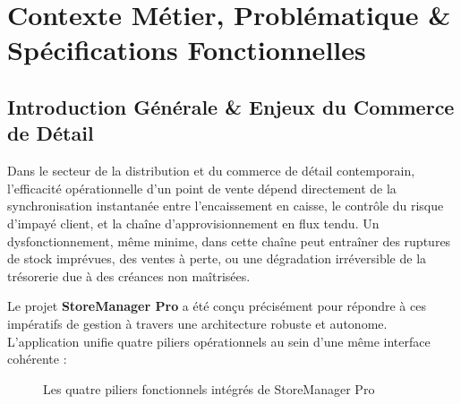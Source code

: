 \documentclass[11pt,a4paper,titlepage,twoside,openright]{report}
\begin{document}
\lstlistoflistings
{}
\clearpage


\chapter{Contexte Métier, Problématique \& Spécifications Fonctionnelles}

\section{Introduction Générale \& Enjeux du Commerce de Détail}

Dans le secteur de la distribution et du commerce de détail contemporain, l'efficacité opérationnelle d'un point de vente dépend directement de la synchronisation instantanée entre l'encaissement en caisse, le contrôle du risque d'impayé client, et la chaîne d'approvisionnement en flux tendu. Un dysfonctionnement, même minime, dans cette chaîne peut entraîner des ruptures de stock imprévues, des ventes à perte, ou une dégradation irréversible de la trésorerie due à des créances non maîtrisées.

Le projet \textbf{StoreManager Pro} a été conçu précisément pour répondre à ces impératifs de gestion à travers une architecture robuste et autonome. L'application unifie quatre piliers opérationnels au sein d'une même interface cohérente :

\begin{figure}[htbp]
\centering
{}
\caption{Les quatre piliers fonctionnels intégrés de StoreManager Pro}
\label{fig:piliers_erp}
\end{figure}
\end{document}

